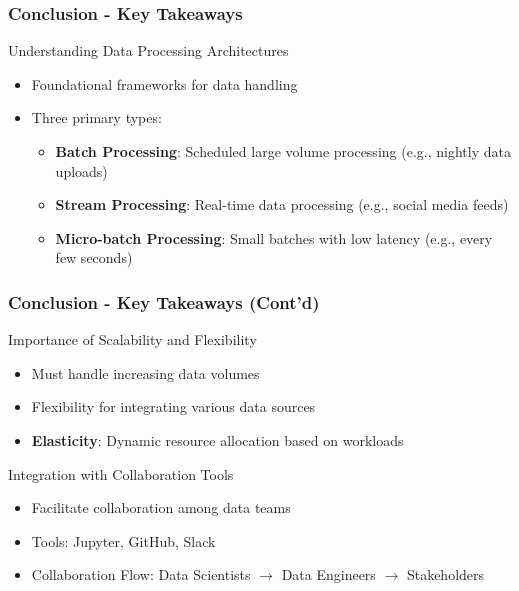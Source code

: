 \documentclass[aspectratio=169]{beamer}
\begin{document}
\begin{frame}[fragile]
    \frametitle{Conclusion - Key Takeaways}
    \begin{block}{Understanding Data Processing Architectures}
        \begin{itemize}
            \item Foundational frameworks for data handling
            \item Three primary types:
            \begin{itemize}
                \item \textbf{Batch Processing}: Scheduled large volume processing (e.g., nightly data uploads)
                \item \textbf{Stream Processing}: Real-time data processing (e.g., social media feeds)
                \item \textbf{Micro-batch Processing}: Small batches with low latency (e.g., every few seconds)
            \end{itemize}
        \end{itemize}
    \end{block}
\end{frame}

\begin{frame}[fragile]
    \frametitle{Conclusion - Key Takeaways (Cont'd)}
    \begin{block}{Importance of Scalability and Flexibility}
        \begin{itemize}
            \item Must handle increasing data volumes
            \item Flexibility for integrating various data sources
            \item \textbf{Elasticity}: Dynamic resource allocation based on workloads
        \end{itemize}
    \end{block}

    \begin{block}{Integration with Collaboration Tools}
        \begin{itemize}
            \item Facilitate collaboration among data teams
            \item Tools: Jupyter, GitHub, Slack
            \item Collaboration Flow: Data Scientists $\rightarrow$ Data Engineers $\rightarrow$ Stakeholders
        \end{itemize}
    \end{block}
\end{frame}
\end{document}
